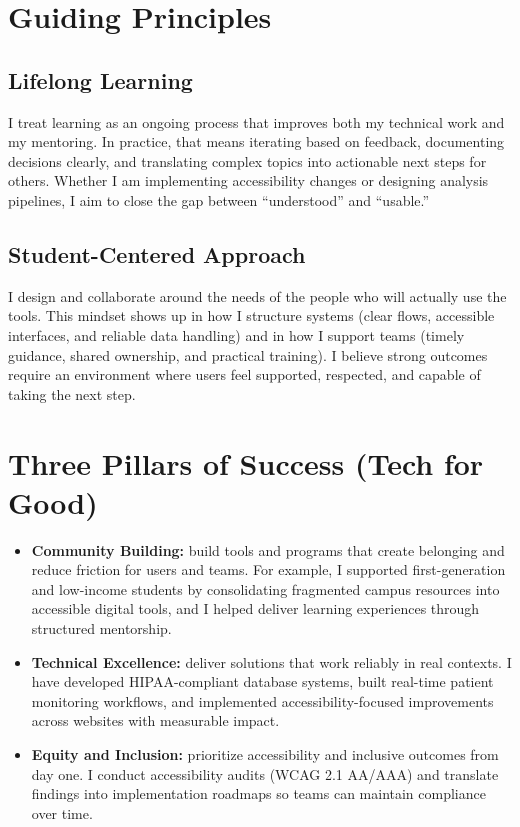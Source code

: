 \documentclass[11pt]{article}
\begin{document}
\section*{Guiding Principles}

\subsection*{Lifelong Learning}
I treat learning as an ongoing process that improves both my technical work and my mentoring. In practice, that means iterating based on feedback, documenting decisions clearly, and translating complex topics into actionable next steps for others. Whether I am implementing accessibility changes or designing analysis pipelines, I aim to close the gap between ``understood'' and ``usable.''

\subsection*{Student-Centered Approach}
I design and collaborate around the needs of the people who will actually use the tools. This mindset shows up in how I structure systems (clear flows, accessible interfaces, and reliable data handling) and in how I support teams (timely guidance, shared ownership, and practical training). I believe strong outcomes require an environment where users feel supported, respected, and capable of taking the next step.

\section*{Three Pillars of Success (Tech for Good)}
\begin{itemize}[leftmargin=*]
    \item \textbf{Community Building:} build tools and programs that create belonging and reduce friction for users and teams. For example, I supported first-generation and low-income students by consolidating fragmented campus resources into accessible digital tools, and I helped deliver learning experiences through structured mentorship.
    \item \textbf{Technical Excellence:} deliver solutions that work reliably in real contexts. I have developed HIPAA-compliant database systems, built real-time patient monitoring workflows, and implemented accessibility-focused improvements across websites with measurable impact.
    \item \textbf{Equity and Inclusion:} prioritize accessibility and inclusive outcomes from day one. I conduct accessibility audits (WCAG 2.1 AA/AAA) and translate findings into implementation roadmaps so teams can maintain compliance over time.
\end{itemize}
\end{document}
